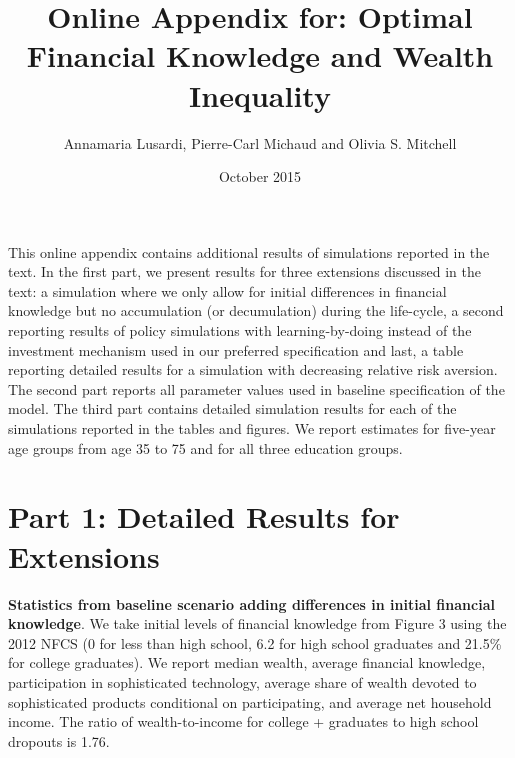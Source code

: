 \documentclass[10pt, oneside]{article}   	%
\title{Online Appendix for: Optimal Financial Knowledge and Wealth Inequality}
\author{Annamaria Lusardi, Pierre-Carl Michaud and Olivia S. Mitchell}
\date{October 2015}							%
\begin{document}
\maketitle
This online appendix contains additional results of simulations reported in the text. In the first part, we present results for three extensions discussed in the text: a simulation where we only allow for initial differences in financial knowledge but no accumulation (or decumulation) during the life-cycle, a second reporting results of policy simulations with learning-by-doing instead of the investment mechanism used in our preferred specification and last, a table reporting detailed results for a simulation with decreasing relative risk aversion. The second part reports all parameter values used in baseline specification of the model. The third part contains detailed simulation results for each of the simulations reported in the tables and figures. We report estimates for five-year age groups from age 35 to 75 and for all three education groups. 


\section*{Part 1: Detailed Results for Extensions}

\begin{table}[H]
\centering

\caption{\textbf{Statistics from baseline scenario adding differences in initial financial knowledge}. We take initial levels of financial knowledge from Figure 3 using the 2012 NFCS (0 for less than high school, 6.2 for high school graduates and 21.5\% for college graduates).  We report median wealth, average financial knowledge, participation in sophisticated technology, average share of wealth devoted to sophisticated products conditional on participating, and average net household income. The ratio of wealth-to-income for college + graduates to high school dropouts is 1.76.}
\end{table}

\pagebreak
\end{document}
